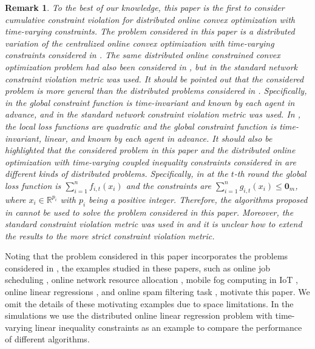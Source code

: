 \documentclass[12pt,draftcls,onecolumn]{IEEEtran}%
\newtheorem{remark}{Remark}
\begin{document}
\begin{remark}\label{online_op:remark_problem}
	To the best of our knowledge, this paper is the first to consider cumulative constraint violation for distributed online convex optimization with time-varying constraints.
	The problem considered in this paper is a distributed variation of the centralized online convex optimization with time-varying constraints considered in \cite{sun2017safety,chen2017online,yu2017online,neely2017online,chen2018heterogeneous,chen2018bandit,cao2019online}. The same distributed online constrained convex optimization problem had also been considered in \cite{sharma2020distributed}, but in \cite{sharma2020distributed} the standard  network constraint violation metric was used.
	It should be pointed out that the considered problem is more general than the distributed problems considered in \cite{yuan2017adaptive,yuan2021distributed,yuan2021distributedb}. Specifically, in \cite{yuan2017adaptive,yuan2021distributedb} the global constraint function is time-invariant and known by each agent in advance, and in \cite{yuan2017adaptive} the standard network constraint violation metric was used. In \cite{yuan2021distributed}, the local loss functions are quadratic and the global constraint function is time-invariant, linear, and known by each agent in advance.
	It should also be highlighted that the considered problem in this paper and the distributed online optimization with time-varying coupled inequality constraints considered in \cite{yi2020distributed,yi2019distributed} are different kinds of distributed problems. Specifically, in \cite{yi2020distributed,yi2019distributed} at the $t$-th round the global loss function is $\sum_{i=1}^{n}f_{i,t}(x_i)$ and the constraints are $\sum_{i=1}^{n}g_{i,t}(x_i)\le{\bm 0}_{m}$, where $x_i\in\mathbb{R}^{p_i}$ with $p_i$ being a positive integer. Therefore, the algorithms proposed in \cite{yi2020distributed,yi2019distributed} cannot be used to solve the problem considered in this paper. Moreover, the standard constraint violation metric was used in \cite{yi2020distributed,yi2019distributed} and it is unclear how to extend the results to the more strict constraint violation metric.
\end{remark}


Noting that the problem considered in this paper incorporates the problems considered in \cite{sun2017safety,chen2017online,yu2017online,neely2017online,chen2018heterogeneous,
	chen2018bandit,cao2019online,yuan2017adaptive,yuan2021distributed,yuan2021distributedb}, the examples studied in these papers, such as online job scheduling \cite{yu2017online}, online network resource allocation \cite{chen2017online}, mobile fog computing in IoT \cite{chen2018bandit}, online linear regressions \cite{yuan2021distributed}, and online spam filtering task \cite{yuan2021distributedb}, motivate this paper. We omit the details of these motivating examples due to space limitations. In the simulations we use the distributed online linear regression problem with time-varying linear inequality constraints as an example to compare the performance of different algorithms.
\end{document}
